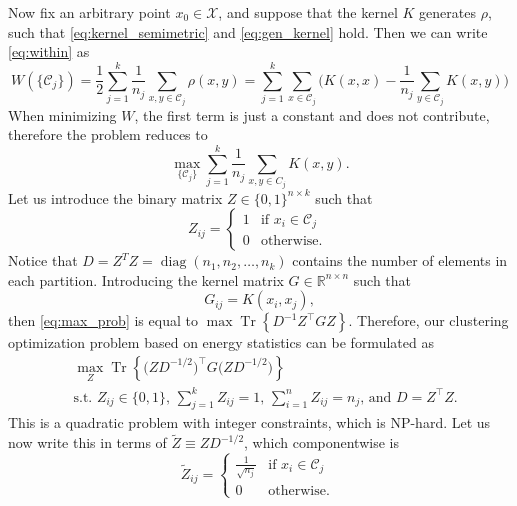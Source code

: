 \documentclass{article}
\DeclareMathOperator{\diag}{diag}
\DeclareMathOperator{\Tr}{Tr}
\newcommand\kk{K}
\newcommand\C{{\mathcal{C}}}
\newcommand\Zt{\widetilde{Z}}
\begin{document}
Now fix an arbitrary point $x_0 \in \mathcal{X}$, and 
suppose that the kernel $K$ generates $\rho$, such that 
\eqref{eq:kernel_semimetric} and \eqref{eq:gen_kernel} hold.
Then we can write \eqref{eq:within} as
\begin{equation}\label{eq:W2}
W(\{ \C_j \} )
= \dfrac{1}{2} \sum_{j=1}^k \dfrac{1}{n_j} \sum_{x,y \in \C_j} \rho(x,y)
= \sum_{j=1}^k \sum_{x \in \C_j}  \bigg(
\kk(x,x) - \dfrac{1}{n_j} \sum_{y \in \C_j} \kk(x,y) \bigg)
\end{equation}
When minimizing $W$, the first term is just a constant and does
not contribute,
therefore the problem reduces to
\begin{equation}
\label{eq:max_prob}
\max_{ \{ \C_j \} } \sum_{j=1}^k \dfrac{1}{n_j} \sum_{x,y\in C_j} \kk(x,y) .
\end{equation}
Let us introduce the binary matrix $Z \in \{ 0,1 \}^{n\times k}$ 
such that 
\begin{equation}
Z_{ij} = \begin{cases}
1 & \mbox{if $x_i \in \C_j$ } \\
0 & \mbox{otherwise.}
\end{cases}
\end{equation}
Notice that $D = Z^T Z = \diag( n_1, n_2, \dotsc, n_k )$ contains the number
of elements in each partition. Introducing the kernel matrix
$G \in \mathbb{R}^{n\times n}$ such that
\begin{equation}
\label{eq:kernel_matrix}
G_{ij} = \kk(x_i, x_j),
\end{equation}
then \eqref{eq:max_prob} is equal to
$\max \Tr \left\{ D^{-1} Z^\top G Z \right\}$. 
Therefore, our clustering optimization problem based on energy statistics
can be formulated as
\begin{equation}\label{eq:qcqp}
\begin{aligned}
& \max_{Z} \Tr\left\{ \big( Z D^{-1/2}\big)^\top G 
\big( ZD^{-1/2} \big) 
\right\} \\
&\mbox{s.t. $Z_{ij} \in \{0,1\}$, $\sum_{j=1}^k Z_{ij} = 1$, 
$\sum_{i=1}^n Z_{ij} = n_j$, and $D = Z^\top Z$}.
\end{aligned}
\end{equation}
This is a quadratic problem with integer constraints, which is 
NP-hard. Let us now write this in terms of 
$\Zt \equiv Z D^{-1/2}$, which componentwise is 
\begin{equation}
\Zt_{ij} = \begin{cases}
\tfrac{1}{\sqrt{n_j}} & \mbox{if $x_i \in \C_j$ } \\
0 & \mbox{otherwise.}
\end{cases}
\end{equation}
\end{document}
